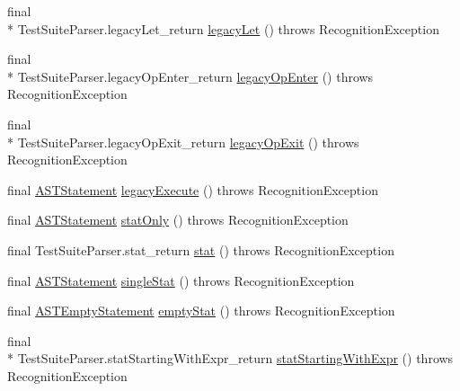 \begin{DoxyCompactItemize}
final \\*
Test\-Suite\-Parser.\-legacy\-Let\-\_\-return \hyperlink{classorg_1_1tzi_1_1use_1_1parser_1_1testsuite_1_1_test_suite_parser_af63f8e67859461a4779ee4293fb44c18}{legacy\-Let} ()  throws Recognition\-Exception 
\item 
final \\*
Test\-Suite\-Parser.\-legacy\-Op\-Enter\-\_\-return \hyperlink{classorg_1_1tzi_1_1use_1_1parser_1_1testsuite_1_1_test_suite_parser_aa389fd89a8aecaf42e4749dbc2840e57}{legacy\-Op\-Enter} ()  throws Recognition\-Exception 
\item 
final \\*
Test\-Suite\-Parser.\-legacy\-Op\-Exit\-\_\-return \hyperlink{classorg_1_1tzi_1_1use_1_1parser_1_1testsuite_1_1_test_suite_parser_ad317aaaa10d60d11014f06cbd22072ba}{legacy\-Op\-Exit} ()  throws Recognition\-Exception 
\item 
final \hyperlink{classorg_1_1tzi_1_1use_1_1parser_1_1soil_1_1ast_1_1_a_s_t_statement}{A\-S\-T\-Statement} \hyperlink{classorg_1_1tzi_1_1use_1_1parser_1_1testsuite_1_1_test_suite_parser_a1f8d97599fae22ed0d3726ceaa1b6929}{legacy\-Execute} ()  throws Recognition\-Exception 
\item 
final \hyperlink{classorg_1_1tzi_1_1use_1_1parser_1_1soil_1_1ast_1_1_a_s_t_statement}{A\-S\-T\-Statement} \hyperlink{classorg_1_1tzi_1_1use_1_1parser_1_1testsuite_1_1_test_suite_parser_a685b8728456ff5c7b75abd6bb67394a1}{stat\-Only} ()  throws Recognition\-Exception 
\item 
final Test\-Suite\-Parser.\-stat\-\_\-return \hyperlink{classorg_1_1tzi_1_1use_1_1parser_1_1testsuite_1_1_test_suite_parser_a977f626c30dc1f1476798785d2afb51c}{stat} ()  throws Recognition\-Exception 
\item 
final \hyperlink{classorg_1_1tzi_1_1use_1_1parser_1_1soil_1_1ast_1_1_a_s_t_statement}{A\-S\-T\-Statement} \hyperlink{classorg_1_1tzi_1_1use_1_1parser_1_1testsuite_1_1_test_suite_parser_a6206fff6eb40b074ab1d9332453727cb}{single\-Stat} ()  throws Recognition\-Exception 
\item 
final \hyperlink{classorg_1_1tzi_1_1use_1_1parser_1_1soil_1_1ast_1_1_a_s_t_empty_statement}{A\-S\-T\-Empty\-Statement} \hyperlink{classorg_1_1tzi_1_1use_1_1parser_1_1testsuite_1_1_test_suite_parser_a84c5502f500b5d7708d26e66d11b3356}{empty\-Stat} ()  throws Recognition\-Exception 
\item 
final \\*
Test\-Suite\-Parser.\-stat\-Starting\-With\-Expr\-\_\-return \hyperlink{classorg_1_1tzi_1_1use_1_1parser_1_1testsuite_1_1_test_suite_parser_ab96444e569b9ae140ed764292cc5dae8}{stat\-Starting\-With\-Expr} ()  throws Recognition\-Exception 

\end{DoxyCompactItemize}
